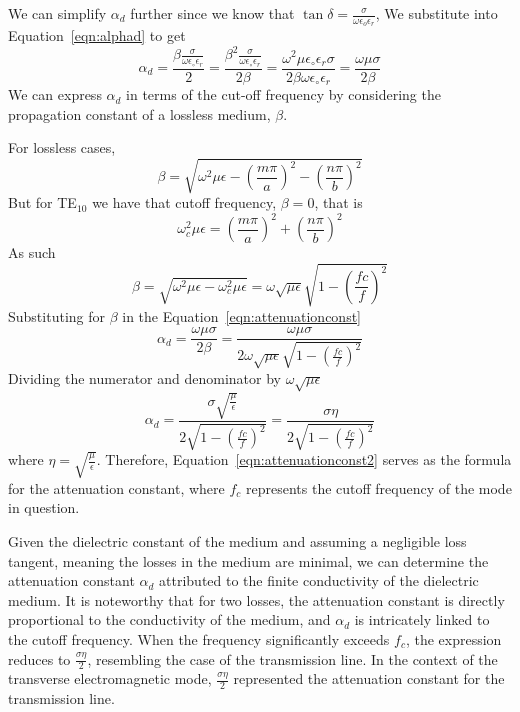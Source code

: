 We can simplify $\alpha_d$ further since we know that $\tan\delta = \frac{\sigma}{\omega\epsilon_{o}\epsilon_{r}}$, We substitute into Equation~\eqref{eqn:alphad} to get
\begin{dmath}
\alpha_{d} = \frac{\beta \frac{\sigma}{\omega\epsilon_\circ\epsilon_r}}{2}
= \frac{\beta^2 \frac{\sigma}{\omega\epsilon_\circ\epsilon_r}}{2\beta}
= \frac{\omega^2\mu\epsilon_\circ\epsilon_r\sigma}{2\beta\omega\epsilon_\circ\epsilon_r}
= \frac{\omega\mu\sigma}{2\beta}
\label{eqn:attenuationconst}
\end{dmath}
We can express $\alpha_d$ in terms of the cut-off frequency by considering the propagation constant of a lossless medium, $\beta$.

For lossless cases, 
\begin{equation*}
\beta = \sqrt{\omega^{2}\mu\epsilon-\left(\frac{m\pi}{a}\right)^{2}-\left(\frac{n\pi}{b}\right)^{2}}
\end{equation*}
But for TE$_{10}$ we have that cutoff frequency, $\beta = 0$, that is
\begin{equation*}
\omega^{2}_{c}\mu\epsilon = \left(\frac{m\pi}{a}\right)^{2}+\left(\frac{n\pi}{b}\right)^{2}
\end{equation*}
As such
\begin{dmath*}
\beta = \sqrt{\omega^{2}\mu\epsilon-\omega^{2}_{c}\mu\epsilon} = \omega\sqrt{\mu\epsilon}\sqrt{1-\left(\frac{fc}{f}\right)^{2}}
\end{dmath*}
Substituting for $\beta$ in the Equation~\ref{eqn:attenuationconst}
\begin{dmath*}	
\alpha_{d}=\frac{\omega\mu\sigma}{2\beta}= \frac{\omega\mu\sigma}{2\omega\sqrt{\mu\epsilon}\sqrt{1-\left(\frac{fc}{f}\right)^{2}}}
\end{dmath*}
Dividing the numerator and denominator by $\omega\sqrt{\mu\epsilon}$
\begin{dmath}
\alpha_{d} = \frac{\sigma\sqrt{\frac{\mu}{\epsilon}}}{2\sqrt{1-\left(\frac{fc}{f}\right)^{2}}}=\frac{\sigma\eta}{2\sqrt{1 - \left(\frac{fc}{f}\right)^{2}}}
\label{eqn:attenuationconst2}
\end{dmath}
where $\eta= \sqrt{\frac{\mu}{\epsilon}}$. Therefore, Equation~\ref{eqn:attenuationconst2} serves as the formula for the attenuation constant, where $f_c$ represents the cutoff frequency of the mode in question.

Given the dielectric constant of the medium and assuming a negligible loss tangent, meaning the losses in the medium are minimal, we can determine the attenuation constant $\alpha_{d}$ attributed to the finite conductivity of the dielectric medium. It is noteworthy that for two losses, the attenuation constant is directly proportional to the conductivity of the medium, and $\alpha_{d}$ is intricately linked to the cutoff frequency. When the frequency significantly exceeds $f_{c}$, the expression reduces to $\frac{\sigma\eta}{2}$, resembling the case of the transmission line. In the context of the transverse electromagnetic mode, $\frac{\sigma\eta}{2}$ represented the attenuation constant for the transmission line.

